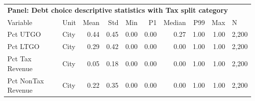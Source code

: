 \begin{table}[H]
\centering
\begin{tabular*}{\textwidth}{@{\extracolsep{\fill}}llrrrrrrrl}
\multicolumn{10}{l}{\textbf{Panel: Debt choice descriptive statistics with Tax split category}}\\

\addlinespace
  \toprule
Variable & Unit & Mean & Std & Min & P1 & Median & P99 & Max & N \\ 
  \hline
Pct UTGO & City & 0.44 & 0.45 & 0.00 & 0.00 & 0.27 & 1.00 & 1.00 & 2,200 \\ 
  Pct LTGO & City & 0.29 & 0.42 & 0.00 & 0.00 & 0.00 & 1.00 & 1.00 & 2,200 \\ 
  Pct Tax Revenue & City & 0.05 & 0.18 & 0.00 & 0.00 & 0.00 & 1.00 & 1.00 & 2,200 \\ 
  Pct NonTax Revenue & City & 0.22 & 0.35 & 0.00 & 0.00 & 0.00 & 1.00 & 1.00 & 2,200 \\ 
   \hline
\end{tabular*}
\end{table}
